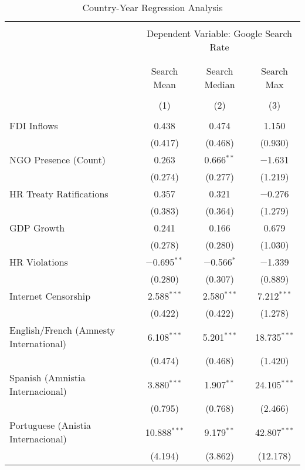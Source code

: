 
\begin{table}[!htbp] \centering 
  \caption{Country-Year Regression Analysis} 
  \label{} 
\begin{tabular}{@{\extracolsep{5pt}}lccc} 
\\[-1.8ex]\hline 
\hline \\[-1.8ex] 
 & \multicolumn{3}{c}{Dependent Variable: Google Search Rate} \\ 
\cline{2-4} 
\\[-1.8ex] & \multicolumn{3}{c}{ } \\ 
 & Search Mean & Search Median & Search Max \\ 
\\[-1.8ex] & (1) & (2) & (3)\\ 
\hline \\[-1.8ex] 
 FDI Inflows & 0.438 & 0.474 & 1.150 \\ 
  & (0.417) & (0.468) & (0.930) \\ 
  NGO Presence (Count) & 0.263 & 0.666$^{**}$ & $-$1.631 \\ 
  & (0.274) & (0.277) & (1.219) \\ 
  HR Treaty Ratifications & 0.357 & 0.321 & $-$0.276 \\ 
  & (0.383) & (0.364) & (1.279) \\ 
  GDP Growth & 0.241 & 0.166 & 0.679 \\ 
  & (0.278) & (0.280) & (1.030) \\ 
  HR Violations & $-$0.695$^{**}$ & $-$0.566$^{*}$ & $-$1.339 \\ 
  & (0.280) & (0.307) & (0.889) \\ 
  Internet Censorship & 2.588$^{***}$ & 2.580$^{***}$ & 7.212$^{***}$ \\ 
  & (0.422) & (0.422) & (1.278) \\ 
  English/French (Amnesty International) & 6.108$^{***}$ & 5.201$^{***}$ & 18.735$^{***}$ \\ 
  & (0.474) & (0.468) & (1.420) \\ 
  Spanish (Amnistia Internacional) & 3.880$^{***}$ & 1.907$^{**}$ & 24.105$^{***}$ \\ 
  & (0.795) & (0.768) & (2.466) \\ 
  Portuguese (Anistia Internacional) & 10.888$^{***}$ & 9.179$^{**}$ & 42.807$^{***}$ \\ 
  & (4.194) & (3.862) & (12.178) \\ 

\end{tabular}
\end{table}
